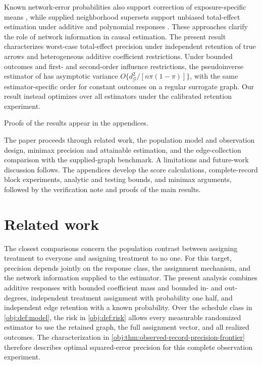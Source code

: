 \documentclass[11pt]{article}
\begin{document}
Known network-error probabilities also support correction of exposure-specific means \citep[Section 3; Theorems 4--7]{LiSussmanKolaczyk2021NetworkNoise}, while supplied neighborhood supersets support unbiased total-effect estimation under additive and polynomial responses \citep[Theorems 1, 4, and 8; Appendix B.1]{ShankarEtAl2024UNITE}. These approaches clarify the role of network information in causal estimation. The present result characterizes worst-case total-effect precision under independent retention of true arrows and heterogeneous additive coefficient restrictions. Under bounded outcomes and first- and second-order influence restrictions, the pseudoinverse estimator of \citet[Assumptions 1--2 and Theorems 1--2]{JiangDengWangWang2024ApproximateNetworks} has asymptotic variance \(O\{d_{\mathcal G}^2/[n\pi(1-\pi)]\}\), with the same estimator-specific order for constant outcomes on a regular surrogate graph. Our result instead optimizes over all estimators under the calibrated retention experiment.

Proofs of the results appear in the appendices.

The paper proceeds through related work, the population model and observation design, minimax precision and attainable estimation, and the edge-collection comparison with the supplied-graph benchmark. A limitations and future-work discussion follows. The appendices develop the score calculations, complete-record block experiments, analytic and testing bounds, and minimax arguments, followed by the verification note and proofs of the main results.


\section{Related work}

The closest comparisons concern the population contrast between assigning treatment to everyone and assigning treatment to no one. For this target, precision depends jointly on the response class, the assignment mechanism, and the network information supplied to the estimator. The present analysis combines additive responses with bounded coefficient mass and bounded in- and out-degrees, independent treatment assignment with probability one half, and independent edge retention with a known probability. Over the schedule class in \cref{obj:def:model}, the risk in \cref{obj:def:risk} allows every measurable randomized estimator to use the retained graph, the full assignment vector, and all realized outcomes. The characterization in \cref{obj:thm:observed-record-precision-frontier} therefore describes optimal squared-error precision for this complete observation experiment.
\end{document}
